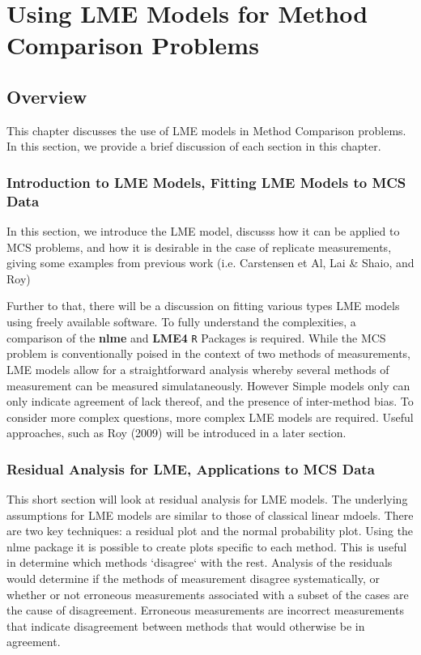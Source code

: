 \documentclass[Main.tex]{subfiles}
\begin{document}
\setcounter{tocdepth}{1}
\tableofcontents
\chapter{Using LME Models for Method Comparison Problems}
\section{Overview}
This chapter discusses the use of LME models in Method Comparison problems. 
In this section, we provide a brief discussion of each section in this chapter.


\subsection*{Introduction to LME Models, Fitting LME Models to MCS Data}

In this section, we introduce the LME model, discusss how it can be applied to MCS problems, and how it is desirable in the case of replicate measurements, giving some examples from previous work (i.e. Carstensen et Al, Lai \& Shaio, and Roy)

Further to that, there will be a discussion on fitting various types LME models using freely available software. To fully understand the complexities, a comparison of the \textbf{nlme} and \textbf{LME4} \texttt{R} Packages is required.
While the MCS problem is conventionally poised in the context of two methods of measurements, LME models allow for a straightforward analysis whereby several methods of measurement can be measured simulataneously. However Simple models only can only indicate agreement of lack thereof, and the presence of inter-method bias. To consider more complex questions, more complex LME models are required.  Useful approaches, such as Roy (2009) will be introduced in a later section.

\subsection*{Residual Analysis for LME, Applications to MCS Data}

This short section will look at residual analysis for LME models. The underlying assumptions for LME models are similar to those of classical linear mdoels. There are two key techniques: a residual plot and the normal probability plot. Using the nlme package it is possible to create plots specific to each method. This is useful in determine which methods `disagree` with the rest.
Analysis of the residuals would determine if the methods of measurement disagree systematically, or whether or not erroneous measurements associated with a subset of the cases are the cause of disagreement.
Erroneous measurements are incorrect measurements that indicate disagreement between methods that would otherwise be in agreement.
\end{document}
